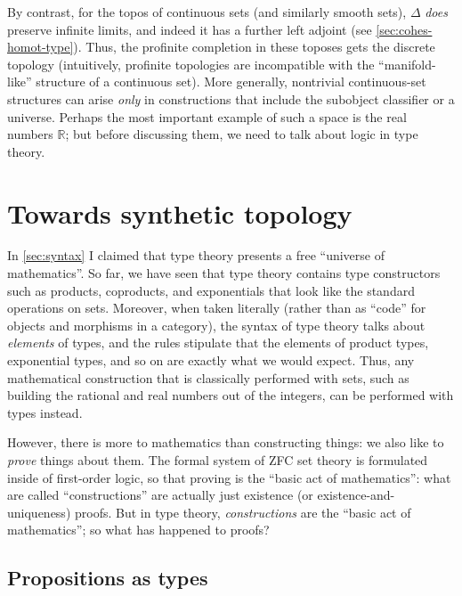 \documentclass[12pt]{article}
\def\R{\mathbb{R}}
\numberwithin{equation}{section}
\begin{document}
By contrast, for the topos of continuous sets (and similarly smooth sets), $\Delta$ \emph{does} preserve infinite limits, and indeed it has a further left adjoint (see \cref{sec:cohes-homot-type}).
Thus, the profinite completion in these toposes gets the discrete topology (intuitively, profinite topologies are incompatible with the ``manifold-like'' structure of a continuous set).
More generally, nontrivial continuous-set structures can arise \emph{only} in constructions that include the subobject classifier or a universe.
Perhaps the most important example of such a space is the real numbers $\R$;
but before discussing them, we need to talk about logic in type theory.


\section{Towards synthetic topology}
\label{sec:synthetic-topology}

In \cref{sec:syntax} I claimed that type theory presents a free ``universe of mathematics''. %
So far, we have seen that type theory contains type constructors such as products, coproducts, and exponentials that look like the standard operations on sets.
Moreover, when taken literally (rather than as ``code'' for objects and morphisms in a category), the syntax of type theory talks about \emph{elements} of types, and the rules stipulate that the elements of product types, exponential types, and so on are exactly what we would expect.
Thus, any mathematical construction that is classically performed with sets, such as building the rational and real numbers out of the integers, can be performed with types instead. %

However, there is more to mathematics than constructing things: we also like to \emph{prove} things about them.
The formal system of ZFC set theory is formulated inside of first-order logic, so that proving is the ``basic act of mathematics'':
what are called ``constructions'' are actually just existence (or existence-and-uniqueness) proofs.
But in type theory, \emph{constructions} are the ``basic act of mathematics''; so what has happened to proofs?

\subsection{Propositions as types}
\label{sec:prop-as-types}
\end{document}
